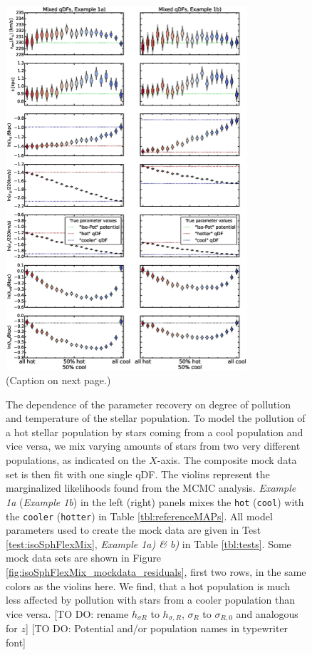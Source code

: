 \begin{figure}
\centering
\includegraphics[width=0.8\textwidth]{figs/isoSphFlexMixCont_violins.eps}
\caption{(Caption on next page.)}
\end{figure}


\addtocounter{figure}{-1}
\begin{figure} [t!]
\caption{The dependence of the parameter recovery on degree of pollution and temperature of the stellar population. To model the pollution of a hot stellar population by stars coming from a cool population and vice versa, we mix varying amounts of stars from two very different populations, as indicated on the $X$-axis. The composite mock data set is then fit with one single qDF. The violins represent the marginalized likelihoods found from the MCMC analysis. \emph{Example 1a} (\emph{Example 1b}) in the left (right) panels mixes the \texttt{hot} (\texttt{cool}) \MAP{} with the \texttt{cooler} (\texttt{hotter}) \MAP{} in Table \ref{tbl:referenceMAPs}. All model parameters used to create the mock data are given in Test \ref{test:isoSphFlexMix}, \emph{Example 1a) \& b)} in Table \ref{tbl:tests}. Some mock data sets are shown in Figure \ref{fig:isoSphFlexMix_mockdata_residuals}, first two rows, in the same colors as the violins here.  We find, that a hot population is much less affected by pollution with stars from a cooler population than vice versa. [TO DO: rename $h_{\sigma R}$ to $h_{\sigma,R}$, $\sigma_R$ to $\sigma_{R,0}$ and analogous for $z$] [TO DO: Potential and/or population names in typewriter font]}
\label{fig:isoSphFlexMixCont}
\end{figure}



